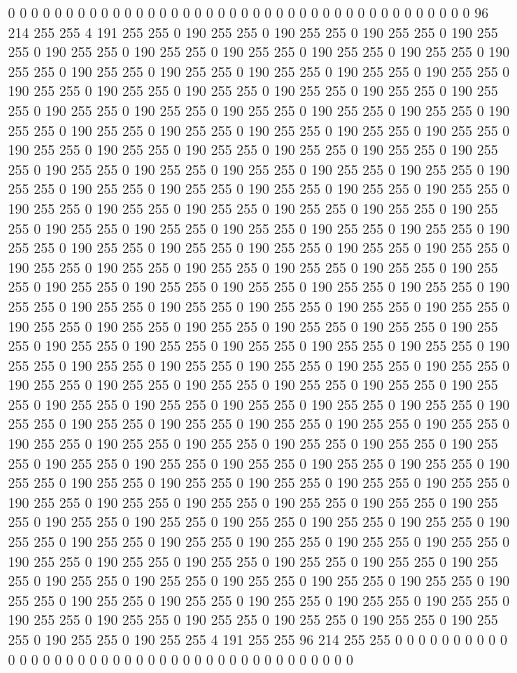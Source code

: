 0 0 0 0 0 0 0 0 0 0 0 0 0 0 0 0 0 0 0 0 0 0 0 0 0 0 0 0 0 0 0 0 0 0 0 0 0 0 0 0 96 214 255 255 4 191 255 255 0 190 255 255 0 190 255 255 0 190 255 255 0 190 255 255 0 190 255 255 0 190 255 255 0 190 255 255 0 190 255 255 0 190 255 255 0 190 255 255 0 190 255 255 0 190 255 255 0 190 255 255 0 190 255 255 0 190 255 255 0 190 255 255 0 190 255 255 0 190 255 255 0 190 255 255 0 190 255 255 0 190 255 255 0 190 255 255 0 190 255 255 0 190 255 255 0 190 255 255 0 190 255 255 0 190 255 255 0 190 255 255 0 190 255 255 0 190 255 255 0 190 255 255 0 190 255 255 0 190 255 255 0 190 255 255 0 190 255 255 0 190 255 255 0 190 255 255 0 190 255 255 
0 190 255 255 0 190 255 255 0 190 255 255 0 190 255 255 0 190 255 255 0 190 255 255 0 190 255 255 0 190 255 255 0 190 255 255 0 190 255 255 0 190 255 255 0 190 255 255 0 190 255 255 0 190 255 255 0 190 255 255 0 190 255 255 0 190 255 255 0 190 255 255 0 190 255 255 0 190 255 255 0 190 255 255 0 190 255 255 0 190 255 255 0 190 255 255 0 190 255 255 0 190 255 255 0 190 255 255 0 190 255 255 0 190 255 255 0 190 255 255 0 190 255 255 0 190 255 255 0 190 255 255 0 190 255 255 0 190 255 255 0 190 255 255 0 190 255 255 0 190 255 255 0 190 255 255 0 190 255 255 0 190 255 255 0 190 255 255 0 190 255 255 0 190 255 255 0 190 255 255 0 190 255 255 0 190 255 255 0 190 255 255 0 190 255 255 0 190 255 255 
0 190 255 255 0 190 255 255 0 190 255 255 0 190 255 255 0 190 255 255 0 190 255 255 0 190 255 255 0 190 255 255 0 190 255 255 0 190 255 255 0 190 255 255 0 190 255 255 0 190 255 255 0 190 255 255 0 190 255 255 0 190 255 255 0 190 255 255 0 190 255 255 0 190 255 255 0 190 255 255 0 190 255 255 0 190 255 255 0 190 255 255 0 190 255 255 0 190 255 255 0 190 255 255 0 190 255 255 0 190 255 255 0 190 255 255 0 190 255 255 0 190 255 255 0 190 255 255 0 190 255 255 0 190 255 255 0 190 255 255 0 190 255 255 0 190 255 255 0 190 255 255 0 190 255 255 0 190 255 255 0 190 255 255 0 190 255 255 0 190 255 255 0 190 255 255 0 190 255 255 0 190 255 255 0 190 255 255 0 190 255 255 0 190 255 255 0 190 255 255 
0 190 255 255 0 190 255 255 0 190 255 255 0 190 255 255 0 190 255 255 0 190 255 255 0 190 255 255 0 190 255 255 0 190 255 255 0 190 255 255 0 190 255 255 0 190 255 255 0 190 255 255 0 190 255 255 0 190 255 255 0 190 255 255 0 190 255 255 0 190 255 255 0 190 255 255 0 190 255 255 0 190 255 255 0 190 255 255 0 190 255 255 0 190 255 255 0 190 255 255 0 190 255 255 0 190 255 255 0 190 255 255 0 190 255 255 0 190 255 255 0 190 255 255 0 190 255 255 0 190 255 255 0 190 255 255 0 190 255 255 0 190 255 255 0 190 255 255 0 190 255 255 4 191 255 255 96 214 255 255 0 0 0 0 0 0 0 0 0 0 0 0 0 0 0 0 0 0 0 0 0 0 0 0 0 0 0 0 0 0 0 0 0 0 0 0 0 0 0 0 
